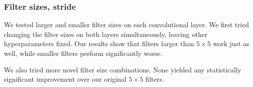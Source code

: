 \documentclass{article}
\begin{document}
\begin{multicols}{2}

\subsubsection{Filter sizes, stride}

We tested larger and smaller filter sizes
on each convolutional layer.
We first tried changing the filter sizes on both layers simultaneously,
leaving other hyperparameters fixed.
Our results show that filters larger than $5\times 5$
work just as well,
while smaller filters perform significantly worse.

We also tried more novel filter size combinations.
None yielded any statistically significant improvement
over our original $5\times 5$ filters.

%



\end{multicols}
\end{document}
